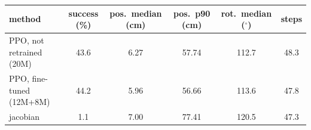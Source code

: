 \begin{tabular}{lccccc}
\hline
method & success (\%) & pos.\ median (cm) & pos.\ p90 (cm) & rot.\ median ($^\circ$) & steps \\
\hline
PPO, not retrained (20M) & 43.6 & 6.27 & 57.74 & 112.7 & 48.3 \\
PPO, fine-tuned (12M+8M) & 44.2 & 5.96 & 56.66 & 113.6 & 47.8 \\
jacobian & 1.1 & 7.00 & 77.41 & 120.5 & 47.3 \\
\hline
\end{tabular}

